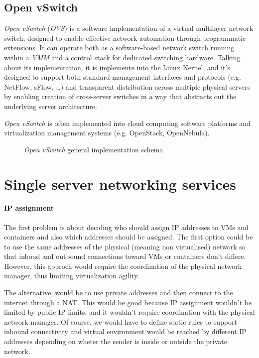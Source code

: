 \subsection{Open vSwitch}
\emph{Open vSwitch} (\emph{OVS}) is a software implementation of a virtual
multilayer network switch, designed to enable effective network automation
through programmatic extensions. It can operate both as a software-based network
switch running within a \emph{VMM} and a control stack for dedicated switching
hardware. Talking about its implementation, it is implemente into the Linux
Kernel, and it's designed to support both standard management interfaces and
protocols (e.g. NetFlow, sFlow, \dots) and transparent distribution across
multiple physical servers by enabling creation of cross-server switches in a way
that abstracts out the underlying server architecture.

\begin{note}
    \emph{Open vSwitch} is often implemented into cloud computing software
    platforms and virtualization management systems (e.g. OpenStack, OpenNebula).
\end{note}

\begin{figure}[h!]
    \centering
    \caption{\emph{Open vSwitch} general implementation schema}
\end{figure}

\section{Single server networking services}
\paragraph{IP assignment}
The first problem is about deciding who should assign IP addresses to VMs and
containers and also which addresses should be assigned. The first option could
be to use the same addresses of the physical (meaning non virtualised) network
so that inboud and outbound connections toward VMs or containers don't differe.
However, this approch would require the coordination of the physical network
manager, thus limiting virtualization agility.

The alternative, would be to use private addresses and then connect to the
internet through a NAT. This would be good because IP assignment wouldn't
be limited by public IP limits, and it wouldn't require coordination with the
physical network manager. Of course, we would have to define static rules to
support inbound connectivity and virtual environment would be reached by
different IP addresses depending on wheter the sender is inside or outside the
private network.

